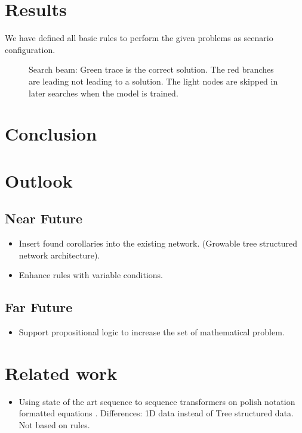 \documentclass{scrartcl}
\begin{document}
\section{Results}
We have defined all basic rules to perform the given problems as scenario configuration.

\begin{figure}[!htbp]
	\centering
	
	\caption{Search beam: Green trace is the correct solution. The red branches are leading not leading to a solution. The light nodes are skipped in later searches when the model is trained.} \label{fig:M1}
\end{figure}

\section{Conclusion}

\section{Outlook}
\subsection{Near Future}
\begin{itemize}
	\item Insert found corollaries into the existing network. (Growable tree structured network architecture). \cite{graves2016hybrid}
	\item Enhance rules with variable conditions.
\end{itemize}

\subsection{Far Future}
\begin{itemize}
	\item Support propositional logic to increase the set of mathematical problem.
\end{itemize}

\section{Related work}

\begin{itemize}
	\item Using state of the art sequence to sequence transformers on polish notation formatted equations \cite{Lample2020Deep}. Differences: 1D data instead of Tree structured data. Not based on rules. 
\end{itemize}

\printbibliography
\end{document}
